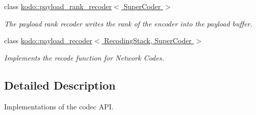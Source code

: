 \begin{DoxyCompactItemize}
class \hyperlink{classkodo_1_1payload__rank__recoder}{kodo\-::payload\-\_\-rank\-\_\-recoder$<$ Super\-Coder $>$}
\begin{DoxyCompactList}\small\item\em The payload rank recoder writes the rank of the encoder into the payload buffer. \end{DoxyCompactList}\item 
class \hyperlink{classkodo_1_1payload__recoder}{kodo\-::payload\-\_\-recoder$<$ Recoding\-Stack, Super\-Coder $>$}
\begin{DoxyCompactList}\small\item\em Implements the recode function for Network Codes. \end{DoxyCompactList}\end{DoxyCompactItemize}


\subsection{Detailed Description}
Implementations of the codec A\-P\-I. 
